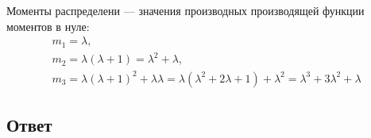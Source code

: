 Моменты распределени --- значения производных производящей функции моментов в нуле:
\begin{gather}
    m_1 = \lambda, \\
    m_2 = \lambda ( \lambda + 1 ) = \lambda^2 + \lambda, \\
    m_3 = \lambda (\lambda + 1)^2 + \lambda \lambda = \lambda ( \lambda^2 + 2 \lambda + 1 ) + \lambda^2 = \lambda^3 + 3 \lambda^2 + \lambda
\end{gather}


\subsection*{Ответ}
